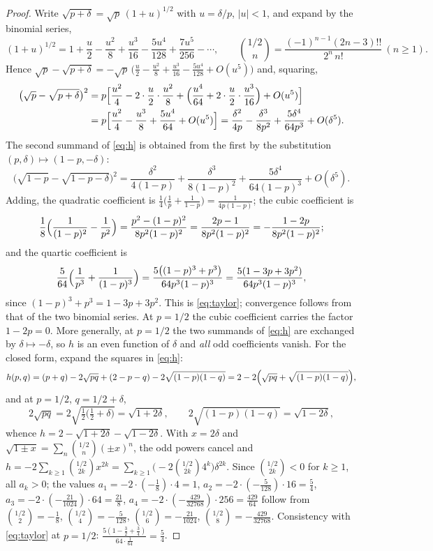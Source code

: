\documentclass[11pt,reqno]{amsart}
\theoremstyle{plain}
\theoremstyle{definition}
\theoremstyle{remark}
\numberwithin{equation}{section}
\begin{document}
\begin{proof}
Write $\sqrt{p+\delta}=\sqrt p\,(1+u)^{1/2}$ with $u=\delta/p$, $|u|<1$, and expand by the binomial series,
\[
(1+u)^{1/2}=1+\frac u2-\frac{u^2}8+\frac{u^3}{16}-\frac{5u^4}{128}+\frac{7u^5}{256}-\cdots,\qquad\binom{1/2}{n}=\frac{(-1)^{n-1}(2n-3)!!}{2^n\,n!}\ (n\ge1).
\]
Hence $\sqrt p-\sqrt{p+\delta}=-\sqrt p\,\bigl(\frac u2-\frac{u^2}8+\frac{u^3}{16}-\frac{5u^4}{128}+O(u^5)\bigr)$ and, squaring,
\begin{align*}
\bigl(\sqrt p-\sqrt{p+\delta}\bigr)^2
&=p\Bigl[\frac{u^2}{4}-2\cdot\frac u2\cdot\frac{u^2}{8}+\Bigl(\frac{u^4}{64}+2\cdot\frac u2\cdot\frac{u^3}{16}\Bigr)+O(u^5)\Bigr]\\
&=p\Bigl[\frac{u^2}{4}-\frac{u^3}{8}+\frac{5u^4}{64}+O(u^5)\Bigr]
=\frac{\delta^2}{4p}-\frac{\delta^3}{8p^2}+\frac{5\delta^4}{64p^3}+O(\delta^5).
\end{align*}
The second summand of \eqref{eq:h} is obtained from the first by the substitution $(p,\delta)\mapsto(1-p,-\delta)$:
\[
\bigl(\sqrt{1-p}-\sqrt{1-p-\delta}\bigr)^2=\frac{\delta^2}{4(1-p)}+\frac{\delta^3}{8(1-p)^2}+\frac{5\delta^4}{64(1-p)^3}+O(\delta^5).
\]
Adding, the quadratic coefficient is $\frac14\bigl(\frac1p+\frac1{1-p}\bigr)=\frac1{4p(1-p)}$; the cubic coefficient is
\[
\frac18\Bigl(\frac1{(1-p)^2}-\frac1{p^2}\Bigr)=\frac{p^2-(1-p)^2}{8p^2(1-p)^2}=\frac{2p-1}{8p^2(1-p)^2}=-\frac{1-2p}{8p^2(1-p)^2};
\]
and the quartic coefficient is
\[
\frac5{64}\Bigl(\frac1{p^3}+\frac1{(1-p)^3}\Bigr)=\frac{5\bigl((1-p)^3+p^3\bigr)}{64p^3(1-p)^3}=\frac{5(1-3p+3p^2)}{64p^3(1-p)^3},
\]
since $(1-p)^3+p^3=1-3p+3p^2$. This is \eqref{eq:taylor}; convergence follows from that of the two binomial series. At $p=1/2$ the cubic coefficient carries the factor $1-2p=0$. More generally, at $p=1/2$ the two summands of \eqref{eq:h} are exchanged by $\delta\mapsto-\delta$, so $h$ is an even function of $\delta$ and \emph{all} odd coefficients vanish. For the closed form, expand the squares in \eqref{eq:h}:
\begin{equation}\label{eq:hBC}
h(p,q)=(p+q)-2\sqrt{pq}+(2-p-q)-2\sqrt{(1-p)(1-q)}=2-2\Bigl(\sqrt{pq}+\sqrt{(1-p)(1-q)}\Bigr),
\end{equation}
and at $p=1/2$, $q=1/2+\delta$,
\[
2\sqrt{pq}=2\sqrt{\tfrac12\bigl(\tfrac12+\delta\bigr)}=\sqrt{1+2\delta},\qquad 2\sqrt{(1-p)(1-q)}=\sqrt{1-2\delta},
\]
whence $h=2-\sqrt{1+2\delta}-\sqrt{1-2\delta}$. With $x=2\delta$ and $\sqrt{1\pm x}=\sum_n\binom{1/2}{n}(\pm x)^n$, the odd powers cancel and $h=-2\sum_{k\ge1}\binom{1/2}{2k}x^{2k}=\sum_{k\ge1}\bigl(-2\binom{1/2}{2k}4^k\bigr)\delta^{2k}$. Since $\binom{1/2}{2k}<0$ for $k\ge1$, all $a_k>0$; the values $a_1=-2\cdot(-\frac18)\cdot4=1$, $a_2=-2\cdot(-\frac5{128})\cdot16=\frac54$, $a_3=-2\cdot(-\frac{21}{1024})\cdot64=\frac{21}8$, $a_4=-2\cdot(-\frac{429}{32768})\cdot256=\frac{429}{64}$ follow from $\binom{1/2}{2}=-\frac18$, $\binom{1/2}{4}=-\frac5{128}$, $\binom{1/2}{6}=-\frac{21}{1024}$, $\binom{1/2}{8}=-\frac{429}{32768}$. Consistency with \eqref{eq:taylor} at $p=1/2$: $\frac{5(1-\frac32+\frac34)}{64\cdot\frac1{64}}=\frac54$.
\end{proof}
\end{document}
